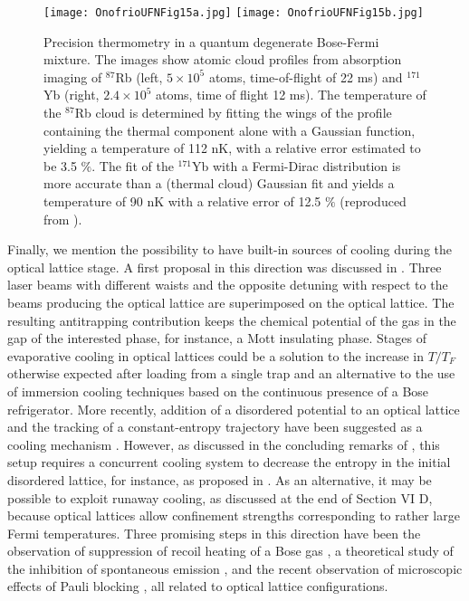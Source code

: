\documentclass[pra,letterpaper,twocolumn,showpacs,superscriptaddress]{revtex4}
\begin{document}
\begin{figure*}[t]
\begin{center}
\texttt{[image: OnofrioUFNFig15a.jpg]}
\texttt{[image: OnofrioUFNFig15b.jpg]}
\caption{Precision thermometry in a quantum degenerate Bose-Fermi mixture. The images show atomic cloud profiles from absorption imaging 
of ${}^{87}$Rb (left, $5 \times 10^5$ atoms, time-of-flight of 22 ms) and ${}^{171}$Yb (right, $2.4 \times 10^5$ atoms, time of flight 12 ms). 
The temperature of the ${}^{87}$Rb cloud is determined by fitting the wings of the profile containing the thermal component alone with a 
Gaussian function,  yielding a temperature of 112 nK, with a relative error estimated to be 3.5 $\%$. The fit of the ${}^{171}$Yb with a Fermi-Dirac 
distribution is more accurate than a (thermal cloud) Gaussian fit and yields a temperature of 90 nK with a relative error of 12.5 $\%$ 
(reproduced from \cite{Vaidya2015}).}
\end{center}
\end{figure*}

Finally, we mention the possibility to have built-in sources of cooling during the optical lattice stage. A first proposal in this direction was discussed 
in \cite{Mathy2012}. Three laser beams with different waists and the opposite detuning with respect to the beams producing the optical lattice are superimposed 
on the optical lattice. The resulting antitrapping contribution keeps the chemical potential of the gas in the gap of the interested phase, for instance,  
a Mott insulating phase. Stages of evaporative cooling in optical lattices could be a solution to the increase in $T/T_F$ otherwise expected after loading 
from a single trap and an alternative to the use of immersion cooling techniques based on the continuous presence of a Bose refrigerator. More recently, addition of 
a disordered potential to an optical lattice and the tracking of a constant-entropy trajectory have been suggested as a cooling mechanism \cite{Paiwa2015}.
However, as discussed in the concluding remarks of \cite{Paiwa2015}, this setup requires a concurrent cooling system to decrease the entropy in 
the initial disordered lattice, for instance, as proposed in \cite{Mathy2012}. As an alternative, it may be possible to exploit  runaway cooling,  
as discussed at the end of Section VI D, because optical lattices allow confinement strengths corresponding to rather large Fermi temperatures. 
Three promising steps in this direction have been the observation of suppression of recoil heating of a Bose gas \cite{Wolf2000}, a theoretical study 
of the inhibition of spontaneous emission \cite{Sandner2011}, and the recent observation of microscopic effects of Pauli blocking \cite{Omran2015}, all 
related to optical lattice configurations.
\end{document}
